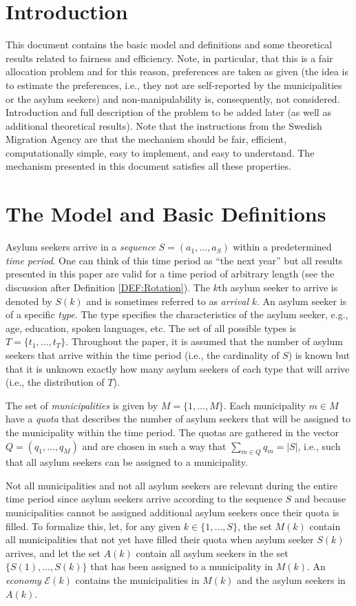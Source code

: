 \documentclass[12pt,fleqn]{article}
\begin{document}
\section{Introduction}
This document contains the basic model and definitions and some theoretical results related to fairness and efficiency. Note, in particular, that this is a fair allocation problem and for this reason, preferences are taken as given (the idea is to estimate the preferences, i.e., they not are self-reported by the municipalities or the asylum seekers) and non-manipulability is, consequently, not considered. Introduction and full description of the problem to be added later (as well as additional theoretical results). Note that the instructions from the Swedish Migration Agency are that the mechanism should be fair, efficient, computationally simple, easy to implement, and easy to understand. The mechanism presented in this document satisfies all these properties.

\section{The Model and Basic Definitions}\label{SEC:Model}
Asylum seekers arrive in a \emph{sequence} $S=(a_1,\ldots,a_S)$ within a predetermined \emph{time period}. One can think of this time period as ``the next year'' but all results presented in this paper are valid for a time period of arbitrary length (see the discussion after Definition \ref{DEF:Rotation}). The $k$th asylum seeker to arrive is denoted by $S(k)$ and is sometimes referred to as \emph{arrival} $k$. An asylum seeker is of a specific \emph{type}. The type specifies the characteristics of the asylum seeker, e.g., age, education, spoken languages, etc. The set of all possible types is $T=\{t_1,\ldots,t_T\}$. Throughout the paper, it is assumed that the number of asylum seekers that arrive within the time period (i.e., the cardinality of $S$) is known but that it is unknown exactly how many asylum seekers of each type that will arrive (i.e., the distribution of $T$).

The set of \emph{municipalities} is given by $M=\{1,\ldots,M\}$. Each municipality $m\in M$ have a \emph{quota} that describes the number of asylum seekers that will be assigned to the municipality within the time period. The quotas are gathered in the vector $Q=(q_1,\ldots, q_M)$ and are chosen in such a way that $\sum_{m\in Q}q_m=|S|$, i.e., such that all asylum seekers can be assigned to a municipality.

Not all municipalities and not all asylum seekers are relevant during the entire time period since asylum seekers arrive according to the sequence $S$ and because municipalities cannot be assigned additional asylum seekers once their quota is filled. To formalize this, let, for any given $k\in \{1,\ldots,S\}$, the set $M(k)$ contain all municipalities that not yet have filled their quota when asylum seeker $S(k)$ arrives, and let the set $A(k)$ contain all asylum seekers in the set $\{S(1),\ldots,S(k)\}$ that has been assigned to a municipality in $M(k)$. An \emph{economy} $\mathcal{E}(k)$ contains the municipalities in $M(k)$ and the asylum seekers in $A(k)$.
\end{document}
